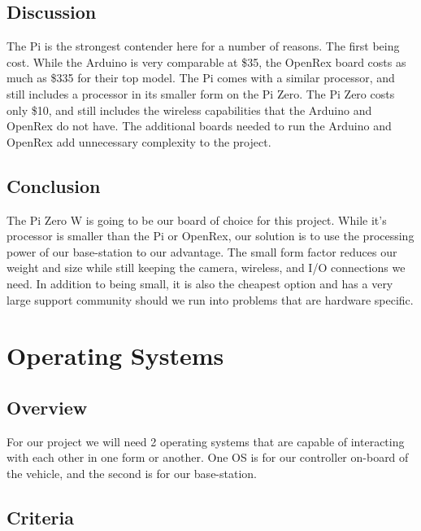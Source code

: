 \documentclass[letterpaper, 10, draftclsnofoot, onecolumn]{IEEEtran}
\begin{document}

\subsection{Discussion}

The Pi is the strongest contender here for a number of reasons. The 
first being cost. While the Arduino is very comparable at \$35, the 
OpenRex board costs as much as \$335 for their top model. The Pi 
comes with a similar processor, and still includes a processor in 
its smaller form on the Pi Zero. The Pi Zero costs only \$10, and 
still includes the wireless capabilities that the Arduino and 
OpenRex do not have. The additional boards needed to run the 
Arduino and OpenRex add unnecessary complexity to the project. 

\subsection{Conclusion}

The Pi Zero W is going to be our board of choice for this project. 
While it's processor is smaller than the Pi or OpenRex, our 
solution is to use the processing power of our base-station to our 
advantage. The small form factor reduces our weight and size while 
still keeping the camera, wireless, and I/O connections we need. In 
addition to being small, it is also the cheapest option and has a 
very large support community should we run into problems that are 
hardware specific. 





\section{Operating Systems}

\subsection{Overview}

For our project we will need 2 operating systems that are capable 
of interacting with each other in one form or another. One OS is for 
our controller on-board of the vehicle, and the second is for our 
base-station. 

\subsection{Criteria}
\end{document}
